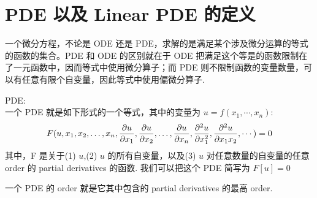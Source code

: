 \chapter{PDE 以及 Linear PDE 的定义}
一个微分方程，不论是 ODE 还是 PDE，求解的是满足某个涉及微分运算的等式的函数的集合。PDE 和 ODE 的区别就在于 ODE 把满足这个等是的函数限制在了一元函数中，因而等式中使用微分算子；而 PDE 则不限制函数的变量数量，可以有任意有限个自变量，因此等式中使用偏微分算子.
\begin{defn}
    PDE:
    \\
    一个 PDE 就是如下形式的一个等式，其中的变量为 $u = f(x_1,  \cdots, x_n)$:
    $$
    \\F(u, x_1, x_2, \ldots, x_n, \frac{\partial u}{\partial x_1}, \frac{\partial u}{\partial x_2}, \ldots, \frac{\partial u}{\partial x_n}, \frac{\partial^2 u}{\partial x_1 ^ 2}, \frac{\partial^2 u}{\partial x_1 x_2 }, \cdots) = 0
    $$
    其中，F 是关于(1) $u$,(2) $u$ 的所有自变量，以及(3) $u$ 对任意数量的自变量的任意 order 的 partial derivatives 的函数.
    我们可以把这个 PDE 简写为 $F[u] = 0$
\end{defn}

\begin{defn}
    一个 PDE 的 order 就是它其中包含的 partial derivatives 的最高 order.
\end{defn}

